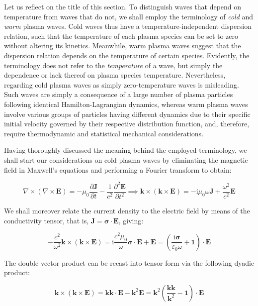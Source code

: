 Let us reflect on the title of this section. To distinguish waves that depend on temperature from waves that do not, we shall employ the terminology of \textit{cold} and \textit{warm} plasma waves. Cold waves thus have a temperature-independent dispersion relation, such that the temperature of each plasma species can be set to zero without altering its kinetics. Meanwhile, warm plasma waves suggest that the dispersion relation depends on the temperature of certain species. Evidently, the terminology does not refer to the \textit{temperature} of a wave, but simply the dependence or lack thereof on plasma species temperature. Nevertheless, regarding cold plasma waves as simply zero-temperature waves is misleading. Such waves are simply a consequence of a large number of plasma particles following identical Hamilton-Lagrangian dynamics, whereas warm plasma waves involve various groups of particles having different dynamics due to their specific initial velocity governed by their respective distribution function, and, therefore, require thermodynamic and statistical mechanical considerations.

\quad Having thoroughly discussed the meaning behind the employed terminology, we shall start our considerations on cold plasma waves by eliminating the magnetic field in Maxwell's equations and performing a Fourier transform to obtain:

\begin{equation}
    \label{eq-4-30}
    \nabla\times(\nabla\times\mathbf{E})=-\mu_0\frac{\partial\mathbf{J}}{\partial t}-\frac{1}{c^2}\frac{\partial^2\mathbf{E}}{\partial t^2}\implies\mathbf{k}\times(\mathbf{k}\times\mathbf{E})=-\mathrm{i}\mu_0\omega\mathbf{J}+\frac{\omega^2}{c^2}\mathbf{E}
\end{equation}

We shall moreover relate the current density to the electric field by means of the conductivity tensor, that is, $\mathbf{J}=\boldsymbol{\sigma}\cdot\mathbf{E}$, giving:

\begin{equation}
    -\frac{c^2}{\omega^2}\mathbf{k}\times(\mathbf{k}\times\mathbf{E})=\mathrm{i}\frac{c^2\mu_0}{\omega}\boldsymbol{\sigma}\cdot\mathbf{E}+\mathbf{E}=\left(\frac{\mathrm{i}\boldsymbol{\sigma}}{\varepsilon_0\omega}+\mathbf{1}\right)\cdot\mathbf{E}
\end{equation}

The double vector product can be recast into tensor form via the following dyadic product:

\begin{equation}
    \mathbf{k}\times(\mathbf{k}\times\mathbf{E})=\mathbf{kk}\cdot\mathbf{E}-\mathbf{k}^2\mathbf{E}=\mathbf{k}^2\left(\frac{\mathbf{kk}}{\mathbf{k}^2}-\mathbf{1}\right)\cdot\mathbf{E}
\end{equation}

